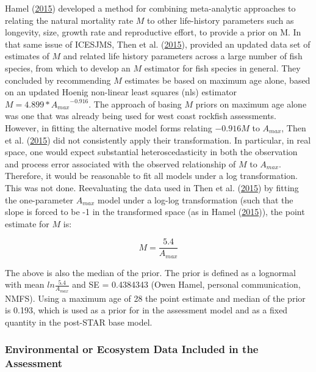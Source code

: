 \documentclass[12pt,]{article}
\begin{document}
Hamel (\protect\hyperlink{ref-Hamel2015}{2015}) developed a method for
combining meta-analytic approaches to relating the natural mortality
rate \(M\) to other life-history parameters such as longevity, size,
growth rate and reproductive effort, to provide a prior on M. In that
same issue of ICESJMS, Then et al.
(\protect\hyperlink{ref-Then2015}{2015}), provided an updated data set
of estimates of \(M\) and related life history parameters across a large
number of fish species, from which to develop an \(M\) estimator for
fish species in general. They concluded by recommending \(M\) estimates
be based on maximum age alone, based on an updated Hoenig non-linear
least squares (nls) estimator \(M= 4.899*{A_{max}}^{-0.916}\). The
approach of basing \(M\) priors on maximum age alone was one that was
already being used for west coast rockfish assessments. However, in
fitting the alternative model forms relating \(-0.916M\) to \(A_{max}\),
Then et al. (\protect\hyperlink{ref-Then2015}{2015}) did not
consistently apply their transformation. In particular, in real space,
one would expect substantial heteroscedasticity in both the observation
and process error associated with the observed relationship of \(M\) to
\(A_{max}\). Therefore, it would be reasonable to fit all models under a
log transformation. This was not done. Reevaluating the data used in
Then et al. (\protect\hyperlink{ref-Then2015}{2015}) by fitting the
one-parameter \(A_{max}\) model under a log-log transformation (such
that the slope is forced to be -1 in the transformed space (as in Hamel
(\protect\hyperlink{ref-Hamel2015}{2015})), the point estimate for \(M\)
is:

\begin{equation}
M = \frac{5.4}{A_{max}}
\end{equation}

The above is also the median of the prior. The prior is defined as a
lognormal with mean \(ln\frac{5.4}{A_{max}}\) and SE = 0.4384343 (Owen
Hamel, personal communication, NMFS). Using a maximum age of 28 the
point estimate and median of the prior is 0.193, which is used as a
prior for in the assessment model and as a fixed quantity in the
post-STAR base model.

\vspace{.5cm}

\subsubsection{Environmental or Ecosystem Data Included in the
Assessment}\label{environmental-or-ecosystem-data-included-in-the-assessment}
\end{document}
